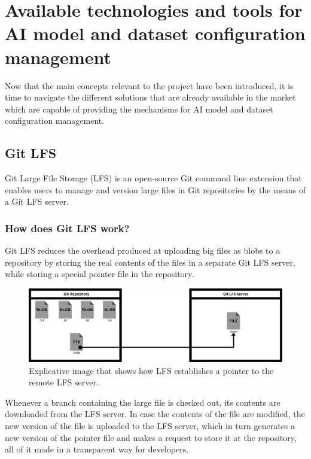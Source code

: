 \section{Available technologies and tools for AI model and dataset configuration management}\label{sec:toolAnalysis}

Now that the main concepts relevant to the project have been introduced, it is time to navigate the different solutions that are already available in the market which are capable of
providing the mechanisms for AI model and dataset configuration management.

\subsection{Git LFS}

Git Large File Storage (LFS) is an open-source Git command line extension that enables users to manage and version large files in Git repositories by the means of a Git LFS 
server.

\subsubsection{How does Git LFS work?}

Git LFS reduces the overhead produced at uploading big files as blobs to a repository by storing the real contents of the files in a separate Git LFS server, while storing a 
special pointer file in the repository.


\begin{figure}[H]
    \centering
    \includegraphics[width=0.8\linewidth]{figs/lfs-pointer.png}
    \caption{Explicative image that shows how LFS establishes a pointer to the remote LFS server.}
    \label{fig:LFSPointer}
\end{figure}

Whenever a branch containing the large file is checked out, its contents are downloaded from the LFS server. In case the contents of the file are modified, the new version of
the file is uploaded to the LFS server, which in turn generates a new version of the pointer file and makes a request to store it at the repository, all of it made in a 
transparent way for developers.


